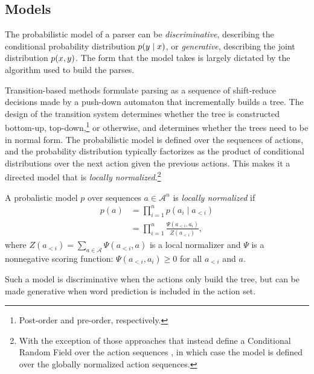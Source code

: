   \subsection{Models}
    The probabilistic model of a parser can be \textit{discriminative}, describing the conditional probability distribution $p(y \mid x)$, or \textit{generative}, describing the joint distribution $p(x, y)$. The form that the model takes is largely dictated by the algorithm used to build the parses.

    Transition-based methods formulate parsing as a sequence of shift-reduce decisions made by a push-down automaton that incrementally builds a tree. The design of the transition system determines whether the tree is constructed bottom-up, top-down,\footnote{Post-order and pre-order, respectively.} or otherwise, and determines whether the trees need to be in normal form. The probabilistic model is defined over the sequences of actions, and the probability distribution typically factorizes as the product of conditional distributions over the next action given the previous actions. This makes it a directed model that is \textit{locally normalized}.\footnote{With the exception of those approaches that instead define a Conditional Random Field over the action sequences \citep{andor2016globally}, in which case the model is defined over the globally normalized action sequences.}
    \begin{definition}{}
      A probalistic model $p$ over sequences $a \in \mathcal{A}^n$ is \textit{locally normalized} if
      \begin{align*}
        p(a)
          &= \prod_{i=1}^{n} p(a_i \mid a_{<i})  \\
          &= \prod_{i=1}^{n} \frac{ \Psi( a_{<i}, a_{i} ) }{ Z( a_{<i} ) },
      \end{align*}
      where $Z( a_{<i} ) = \sum_{a \in \mathcal{A}} \Psi( a_{<i}, a )$  is a local normalizer and $\Psi$ is a nonnegative scoring function: $\Psi( a_{<i}, a_{i} ) \geq 0$ for all $a_{<i}$ and $a$.
    \end{definition}
    Such a model is discriminative when the actions only build the tree, but can be made generative when word prediction is included in the action set.

